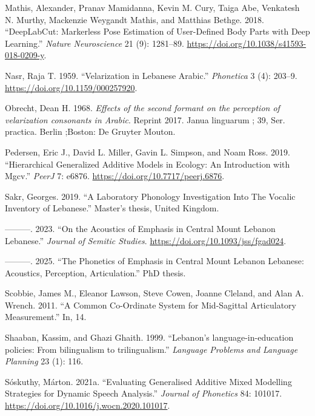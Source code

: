 \documentclass[
]{interact}
\newlength{\cslhangindent}
\newenvironment{CSLReferences}[2] %
 {\begin{list}{}{%
  \setlength{\itemindent}{0pt}
  \setlength{\leftmargin}{0pt}
  \setlength{\parsep}{0pt}
  \ifodd #1
   \setlength{\leftmargin}{\cslhangindent}
   \setlength{\itemindent}{-1\cslhangindent}
  \fi
  \setlength{\itemsep}{#2\baselineskip}}}
 {\end{list}}
\begin{document}
\begin{CSLReferences}{1}{0}
Mathis, Alexander, Pranav Mamidanna, Kevin M. Cury, Taiga Abe, Venkatesh
N. Murthy, Mackenzie Weygandt Mathis, and Matthias Bethge. 2018.
{``DeepLabCut: Markerless Pose Estimation of User-Defined Body Parts
with Deep Learning.''} \emph{Nature Neuroscience} 21 (9): 1281--89.
\url{https://doi.org/10.1038/s41593-018-0209-y}.

Nasr, Raja T. 1959. {``Velarization in Lebanese Arabic.''}
\emph{Phonetica} 3 (4): 203--9. \url{https://doi.org/10.1159/000257920}.

Obrecht, Dean H. 1968. \emph{Effects of the second formant on the
perception of velarization consonants in Arabic}. Reprint 2017. Janua
linguarum ; 39, Ser. practica. Berlin ;Boston: De Gruyter Mouton.

Pedersen, Eric J., David L. Miller, Gavin L. Simpson, and Noam Ross.
2019. {``Hierarchical Generalized Additive Models in Ecology: An
Introduction with Mgcv.''} \emph{PeerJ} 7: e6876.
\url{https://doi.org/10.7717/peerj.6876}.

Sakr, Georges. 2019. {``A Laboratory Phonology Investigation Into The
Vocalic Inventory of Lebanese.''} Master's thesis, United Kingdom.

---------. 2023. {``On the Acoustics of Emphasis in Central Mount
Lebanon Lebanese.''} \emph{Journal of Semitic Studies}.
\url{https://doi.org/10.1093/jss/fgad024}.

---------. 2025. {``The Phonetics of Emphasis in Central Mount Lebanon
Lebanese: Acoustics, Perception, Articulation.''} PhD thesis.

Scobbie, James M., Eleanor Lawson, Steve Cowen, Joanne Cleland, and Alan
A. Wrench. 2011. {``A Common Co-Ordinate System for Mid-Sagittal
Articulatory Measurement.''} In, 14.

Shaaban, Kassim, and Ghazi Ghaith. 1999. {``Lebanon's
language-in-education policies: From bilingualism to trilingualism.''}
\emph{Language Problems and Language Planning} 23 (1): 116.

Sóskuthy, Márton. 2021a. {``Evaluating Generalised Additive Mixed
Modelling Strategies for Dynamic Speech Analysis.''} \emph{Journal of
Phonetics} 84: 101017. \url{https://doi.org/10.1016/j.wocn.2020.101017}.


\end{CSLReferences}
\end{document}
